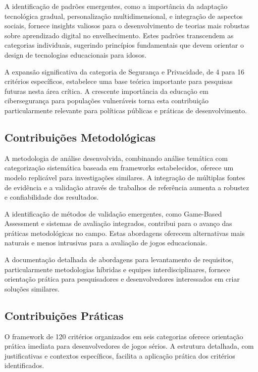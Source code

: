 \begin{table}[H]
A identificação de padrões emergentes, como a importância da adaptação tecnológica gradual, personalização multidimensional, e integração de aspectos sociais, fornece insights valiosos para o desenvolvimento de teorias mais robustas sobre aprendizado digital no envelhecimento. Estes padrões transcendem as categorias individuais, sugerindo princípios fundamentais que devem orientar o design de tecnologias educacionais para idosos.

A expansão significativa da categoria de Segurança e Privacidade, de 4 para 16 critérios específicos, estabelece uma base teórica importante para pesquisas futuras nesta área crítica. A crescente importância da educação em cibersegurança para populações vulneráveis torna esta contribuição particularmente relevante para políticas públicas e práticas de desenvolvimento.

\subsection{Contribuições Metodológicas}
\label{subsec:contribuicoes_metodologicas}

A metodologia de análise desenvolvida, combinando análise temática com categorização sistemática baseada em frameworks estabelecidos, oferece um modelo replicável para investigações similares. A integração de múltiplas fontes de evidência e a validação através de trabalhos de referência aumenta a robustez e confiabilidade dos resultados.

A identificação de métodos de validação emergentes, como Game-Based Assessment e sistemas de avaliação integrados, contribui para o avanço das práticas metodológicas no campo. Estas abordagens oferecem alternativas mais naturais e menos intrusivas para a avaliação de jogos educacionais.

A documentação detalhada de abordagens para levantamento de requisitos, particularmente metodologias híbridas e equipes interdisciplinares, fornece orientação prática para pesquisadores e desenvolvedores interessados em criar soluções similares.

\subsection{Contribuições Práticas}
\label{subsec:contribuicoes_praticas}

O framework de 120 critérios organizados em seis categorias oferece orientação prática imediata para desenvolvedores de jogos sérios. A estrutura detalhada, com justificativas e contextos específicos, facilita a aplicação prática dos critérios identificados.


\end{table}
